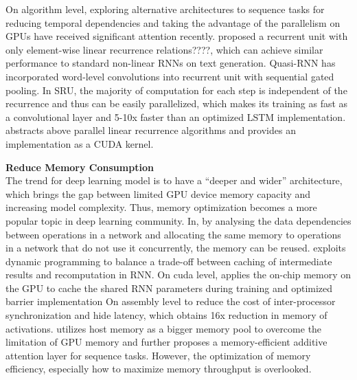 \documentclass{article}
\begin{document}
On algorithm level, exploring alternative architectures to sequence tasks for reducing temporal dependencies and taking the advantage of the parallelism on GPUs have received significant attention recently\cite{chang2017dilated, kaiser2016can, kaiser2015neural, gehring2016convolutional, gehring2017convolutional, kalchbrenner2016neural}. 
\cite{Balduzzi:2016:SRN:3045390.3045527} proposed a recurrent unit with only element-wise linear recurrence relations????, which can achieve similar performance to standard non-linear RNNs on text generation.
\cite{bradbury2016quasi} Quasi-RNN has incorporated word-level convolutions into recurrent unit with sequential gated pooling. 
In SRU\cite{lei2017training}, the majority of computation for each step is independent of the recurrence and thus can be easily parallelized, which makes its training as fast as a convolutional layer and 5-10x faster than an optimized LSTM implementation. 
\cite{martin2017parallelizing}abstracts above parallel linear recurrence algorithms and provides an implementation as a CUDA kernel.






\textbf{Reduce Memory Consumption} \\
 The trend for deep learning model is to have a “deeper and wider” architecture, which brings the gap between limited GPU device memory capacity and increasing model complexity. Thus, memory optimization becomes a more popular topic in deep learning community. In\cite{chen2015mxnet}, by analysing the data dependencies between operations in a network and allocating the same memory to operations in a network that do not use it concurrently, the memory can be reused.  \cite{gruslys2016memory} exploits dynamic programming to balance a trade-off between caching of intermediate results and recomputation in RNN. On cuda level, \cite{diamos2016persistent} applies the on-chip memory on the GPU to cache the shared RNN parameters during training and optimized barrier implementation On assembly level to reduce the cost of inter-processor synchronization and hide latency, which obtains 16x reduction in memory of activations. \cite{mengtraining} utilizes host memory as a bigger memory pool to overcome the limitation of GPU memory and further proposes a memory-efficient additive attention layer\cite{bahdanau2014neural} for sequence tasks. However, the optimization of memory efficiency, especially how to maximize memory throughput is overlooked. 
\end{document}
